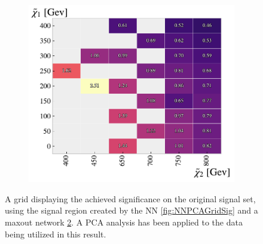 \begin{figure}[H]
{\begin{subfigure}{.5\textwidth}
        \includegraphics[width=\textwidth]{Figures/MLResults/NN/SUSY/Grid/MaxOutPCAGridSig.pdf}
        \caption{}
        \label{fig:MaxOutPCAGridSig}
    \end{subfigure}
    }
    \caption{A grid displaying the achieved significance on the original signal set, using the signal region 
    created by the \acs{NN} \ref{fig:NNPCAGridSig} and a maxout network \ref{fig:MaxOutPCAGridSig}. A \ac{PCA} 
    analysis has been applied to the data being utilized in this result.}
\end{figure}


